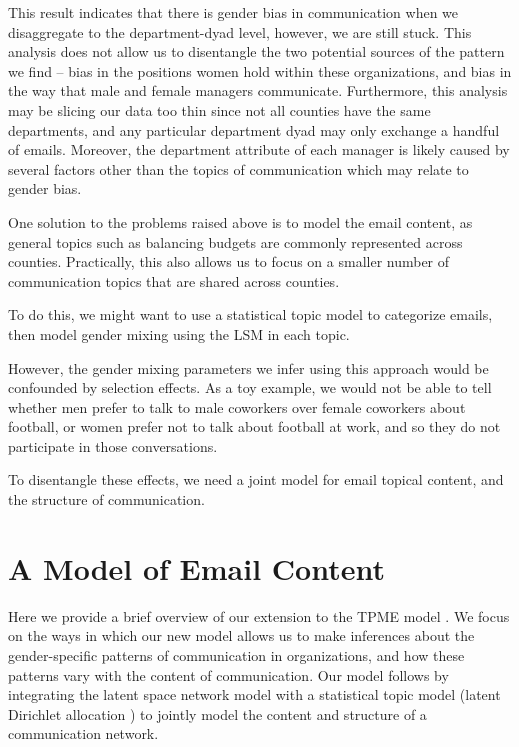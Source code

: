 \documentclass{pnastwo}
\begin{document}
\begin{article}
This result indicates that there is gender bias in communication when we disaggregate to the department-dyad level, however, we are still stuck. This analysis does not allow us to disentangle the two potential sources of the pattern we find -- bias in the positions women hold within these organizations, and bias in the way that male and female managers communicate. Furthermore, this analysis may be slicing our data too thin since not all counties have the same departments, and any particular department dyad may only exchange a handful of emails. Moreover, the department attribute of each manager is likely caused by several factors other than the topics of communication which may relate to gender bias. 
	
One solution to the problems raised above is to model the email content, as general topics such as balancing budgets are commonly represented across counties. Practically, this also allows us to focus on a smaller number of communication topics that are shared across counties.
	
To do this, we might want to use a statistical topic model to categorize emails, then model  gender mixing using the LSM in each topic.
	
However, the gender mixing parameters we infer using this approach would be confounded by selection effects. As a toy example, we would not be able to tell whether men prefer to talk to male coworkers over female coworkers about football, or women prefer not to talk about football at work, and so they do not participate in those conversations. 
	
To disentangle these effects, we need a joint model for email topical content, and the structure of communication.
	


\section{A Model of Email Content}
Here we provide a brief overview of our extension to the TPME model \citep{Krafft2012}. We focus on the ways in which our new model allows us to make inferences about the gender-specific patterns of communication in organizations, and how these patterns vary with the content of communication. Our model follows \citep{Krafft2012} by integrating the latent space network model \citep{Hoff2002a} with a statistical topic model (latent Dirichlet allocation \cite{Blei2003}) to jointly model the content and structure of a communication network. 


\end{article}
\end{document}
